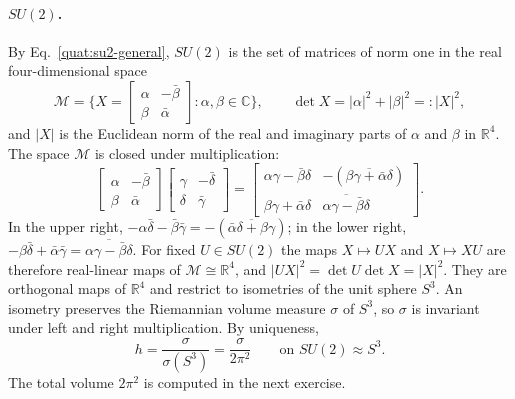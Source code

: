 \paragraph{$SU(2)$.} By Eq.~\eqref{quat:su2-general}, $SU(2)$ is the set
of matrices of norm one in the real four-dimensional space
\begin{equation}\label{haar:quaternion-space}
 \mathcal M=\Big\{X=\begin{bmatrix}\alpha&-\bar\beta\\ \beta&\bar\alpha\end{bmatrix}
 :\alpha,\beta\in\mathbb C\Big\},\qquad
 \det X=|\alpha|^2+|\beta|^2=:|X|^2 ,
\end{equation}
and $|X|$ is the Euclidean norm of the real and imaginary parts of $\alpha$
and $\beta$ in $\mathbb R^4$. The space $\mathcal M$ is closed under
multiplication:
\begin{equation}\label{haar:M-product}
 \begin{bmatrix}\alpha&-\bar\beta\\ \beta&\bar\alpha\end{bmatrix}
 \begin{bmatrix}\gamma&-\bar\delta\\ \delta&\bar\gamma\end{bmatrix}
 =\begin{bmatrix}\alpha\gamma-\bar\beta\delta&-(\overline{\beta\gamma+\bar\alpha\delta})\\
 \beta\gamma+\bar\alpha\delta&\overline{\alpha\gamma-\bar\beta\delta}\end{bmatrix}.
\end{equation}
In the upper right, $-\alpha\bar\delta-\bar\beta\bar\gamma
=-(\overline{\bar\alpha\delta+\beta\gamma})$; in the lower right,
$-\beta\bar\delta+\bar\alpha\bar\gamma=\overline{\alpha\gamma-\bar\beta\delta}$.
For fixed $U\in SU(2)$ the maps $X\mapsto UX$ and $X\mapsto XU$ are
therefore real-linear maps of $\mathcal M\cong\mathbb R^4$, and
$|UX|^2=\det U\det X=|X|^2$. They are orthogonal maps of $\mathbb R^4$
and restrict to isometries of the unit sphere $S^3$. An isometry preserves
the Riemannian volume measure $\sigma$ of $S^3$, so $\sigma$ is invariant
under left and right multiplication. By uniqueness,
\begin{equation}\label{haar:SU2-round}
 h=\frac{\sigma}{\sigma(S^3)}=\frac{\sigma}{2\pi^2}
 \qquad\text{on }SU(2)\approx S^3 .
\end{equation}
The total volume $2\pi^2$ is computed in the next exercise.

